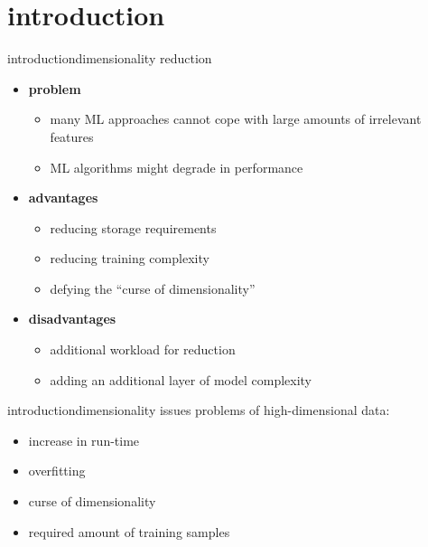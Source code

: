     \section[intro]{introduction}
		\begin{frame}{introduction}{dimensionality reduction}
            \begin{itemize}
                \item   \textbf{problem}
                    \begin{itemize}
                        \item   many ML approaches cannot cope with large amounts of irrelevant features
                        \item   ML algorithms might degrade in performance
                    \end{itemize}
                \bigskip
                \item<2->   \textbf{advantages}
                    \begin{itemize}
                        \item   reducing storage requirements
                        \item   reducing training complexity
                        \item   defying the ``curse of dimensionality''
                    \end{itemize}
                \bigskip
                \item<3->   \textbf{disadvantages}
                    \begin{itemize}
                        \item   additional workload for reduction
                        \item   adding an additional layer of model complexity
                    \end{itemize}
            \end{itemize}
		\end{frame}
        
		\begin{frame}{introduction}{dimensionality issues}
            \vspace{-2mm}
            problems of high-dimensional data:
            \begin{itemize}
                \item   increase in run-time
                \item   overfitting
                \item   curse of dimensionality
                \item   required amount of training samples 
            \end{itemize}
			
		\end{frame}


